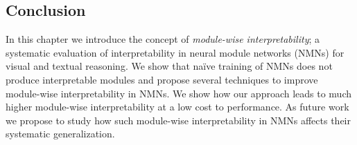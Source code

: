 \documentclass[main.tex]{subfiles}
\begin{document}
\subsection{Conclusion}
In this chapter we introduce the concept of \emph{module-wise interpretability}; a systematic evaluation of interpretability in neural module networks (NMNs) for visual and textual reasoning. We show that na\"ive training of NMNs does not produce interpretable modules and propose several techniques to improve module-wise interpretability in NMNs.
We show how our approach leads to much higher  module-wise interpretability at a low cost to performance.
As future work we propose to study how such module-wise interpretability in NMNs affects their systematic generalization.


\biblio
\end{document}

